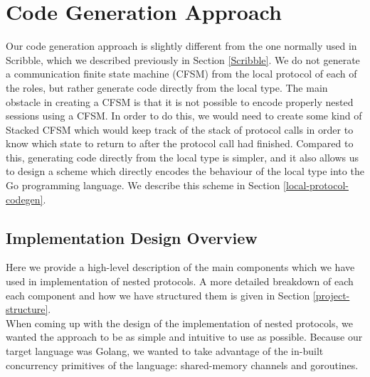 \documentclass[12pt,twoside]{report}
\begin{document}

\section{Code Generation Approach}\label{codegen-approach}
Our code generation approach is slightly different from the one normally used in Scribble, which we described previously in Section \ref{Scribble}. We do not generate a communication finite state machine (CFSM) from the local protocol of each of the roles, but rather generate code directly from the local type. The main obstacle in creating a CFSM is that it is not possible to encode properly nested sessions using a CFSM. In order to do this, we would need to create some kind of Stacked CFSM which would keep track of the stack of protocol calls in order to know which state to return to after the protocol call had finished. Compared to this, generating code directly from the local type is simpler, and it also allows us to design a scheme which directly encodes the behaviour of the local type into the Go programming language. We describe this scheme in Section \ref{local-protocol-codegen}.

\subsection{Implementation Design Overview}\label{design-overview}
Here we provide a high-level description of the main components which we have used in implementation of nested protocols. A more detailed breakdown of each each component and how we have structured them is given in Section \ref{project-structure}. \\

When coming up with the design of the implementation of nested protocols, we wanted the approach to be as simple and intuitive to use as possible. Because our target language was Golang, we wanted to take advantage of the in-built concurrency primitives of the language: shared-memory channels and goroutines.\\
\end{document}
